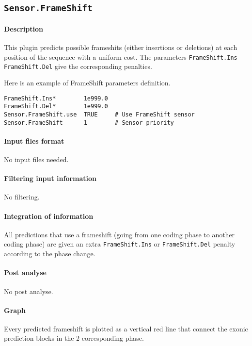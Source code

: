 
\subsection{\texttt{Sensor.FrameShift}}

\paragraph{Description}

This plugin predicts possible frameshits (either insertions or
deletions) at each position of the sequence with a uniform cost. The
parameters \texttt{FrameShift.Ins} \texttt{FrameShift.Del} give the
corresponding penalties.

Here is an example of FrameShift parameters definition.
\begin{Verbatim}[fontsize=\small]
FrameShift.Ins*        1e999.0
FrameShift.Del*        1e999.0
Sensor.FrameShift.use  TRUE     # Use FrameShift sensor
Sensor.FrameShift      1        # Sensor priority
\end{Verbatim}

\paragraph{Input files format}

No input files  needed.

\paragraph{Filtering input information}

No filtering.

\paragraph{Integration of information}

All predictions that use a frameshift (going from one coding phase to
another coding phase) are given an extra \texttt{FrameShift.Ins} or
\texttt{FrameShift.Del} penalty according to the phase change.

\paragraph{Post analyse}

No post analyse.

\paragraph{Graph}

Every predicted frameshift is plotted as a vertical red line that
connect the exonic prediction blocks in the 2 corresponding phase.


